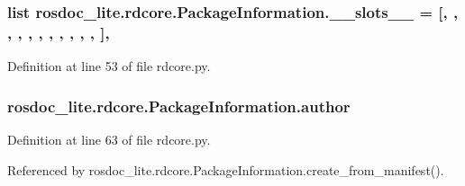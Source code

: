 \subsubsection[{\texorpdfstring{\+\_\+\+\_\+slots\+\_\+\+\_\+}{__slots__}}]{\setlength{\rightskip}{0pt plus 5cm}list rosdoc\+\_\+lite.\+rdcore.\+Package\+Information.\+\_\+\+\_\+slots\+\_\+\+\_\+ = \mbox{[}\textquotesingle{}, \textquotesingle{}, \textquotesingle{}, \textquotesingle{}, \textquotesingle{}, \textquotesingle{}, \textquotesingle{}, \textquotesingle{}, \textquotesingle{}, \textquotesingle{}, \textquotesingle{}, \textquotesingle{}\mbox{]}\hspace{0.3cm}{\ttfamily [static]}, {\ttfamily [private]}}\hypertarget{classrosdoc__lite_1_1rdcore_1_1PackageInformation_a59d7eac614a4f3771c7c771e18d116fe}{}\label{classrosdoc__lite_1_1rdcore_1_1PackageInformation_a59d7eac614a4f3771c7c771e18d116fe}


Definition at line 53 of file rdcore.\+py.

\subsubsection[{\texorpdfstring{author}{author}}]{\setlength{\rightskip}{0pt plus 5cm}rosdoc\+\_\+lite.\+rdcore.\+Package\+Information.\+author}\hypertarget{classrosdoc__lite_1_1rdcore_1_1PackageInformation_a5c27cda0ae2ab8203fb74d3d5e8d0ed2}{}\label{classrosdoc__lite_1_1rdcore_1_1PackageInformation_a5c27cda0ae2ab8203fb74d3d5e8d0ed2}


Definition at line 63 of file rdcore.\+py.



Referenced by rosdoc\+\_\+lite.\+rdcore.\+Package\+Information.\+create\+\_\+from\+\_\+manifest().

